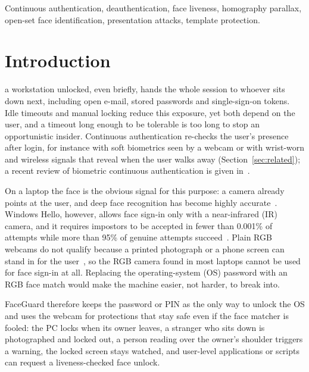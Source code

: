 \documentclass{ieeeaccess}
\begin{document}
\begin{keywords}
Continuous authentication, deauthentication, face liveness, homography parallax, open-set face identification, presentation attacks, template protection.
\end{keywords}

\titlepgskip=-21pt

\maketitle


\section{Introduction}
 a workstation unlocked, even briefly, hands the whole session to whoever sits down next, including open e-mail, stored passwords and single-sign-on tokens. Idle timeouts and manual locking reduce this exposure, yet both depend on the user, and a timeout long enough to be tolerable is too long to stop an opportunistic insider. Continuous authentication re-checks the user's presence after login, for instance with soft biometrics seen by a webcam or with wrist-worn and wireless signals that reveal when the user walks away (Section~\ref{sec:related}); a recent review of biometric continuous authentication is given in~\cite{ayeswarya2024review}.

On a laptop the face is the obvious signal for this purpose: a camera already points at the user, and deep face recognition has become highly accurate~\cite{deng2019arcface}. Windows Hello, however, allows face sign-in only with a near-infrared (IR) camera, and it requires impostors to be accepted in fewer than 0.001\% of attempts while more than 95\% of genuine attempts succeed~\cite{ms2024hello}. Plain RGB webcams do not qualify because a printed photograph or a phone screen can stand in for the user~\cite{zhang2012casiafasd}, so the RGB camera found in most laptops cannot be used for face sign-in at all. Replacing the operating-system (OS) password with an RGB face match would make the machine easier, not harder, to break into.

FaceGuard therefore keeps the password or PIN as the only way to unlock the OS and uses the webcam for protections that stay safe even if the face matcher is fooled: the PC locks when its owner leaves, a stranger who sits down is photographed and locked out, a person reading over the owner's shoulder triggers a warning, the locked screen stays watched, and user-level applications or scripts can request a liveness-checked face unlock.
\end{document}
